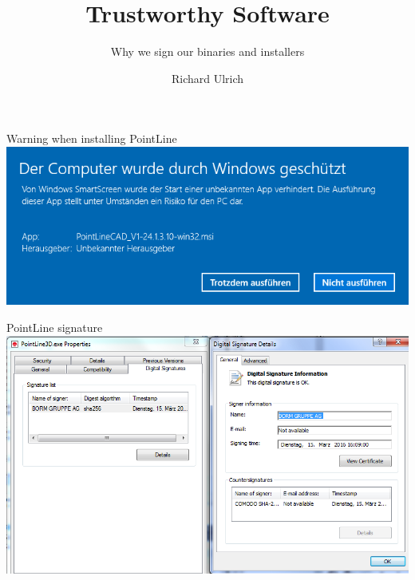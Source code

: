\documentclass[11pt]{beamer}
\author{Richard Ulrich}
\title{Trustworthy Software}
\subtitle{Why we sign our binaries and installers}
\institute{BORM Informatik AG}
\begin{document}
\begin{frame}
\titlepage
\end{frame}


\begin{frame}{Warning when installing PointLine}
\includegraphics[scale=0.5]{obsolete_signature.png}
\end{frame}

\begin{frame}{PointLine signature}
\includegraphics[scale=0.38]{pointLine_signature.png}
\end{frame}
\end{document}
